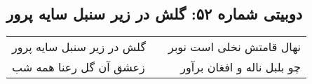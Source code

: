 \begin{center}
\section*{دوبیتی شماره ۵۲: گلش در زیر سنبل سایه پرور}
\label{sec:052}
\begin{longtable}{l p{0.5cm} r}
گلش در زیر سنبل سایه پرور
&&
نهال قامتش نخلی است نوبر
\\
زعشق آن گل رعنا همه شب
&&
چو بلبل ناله و افغان برآور
\\
\end{longtable}
\end{center}
